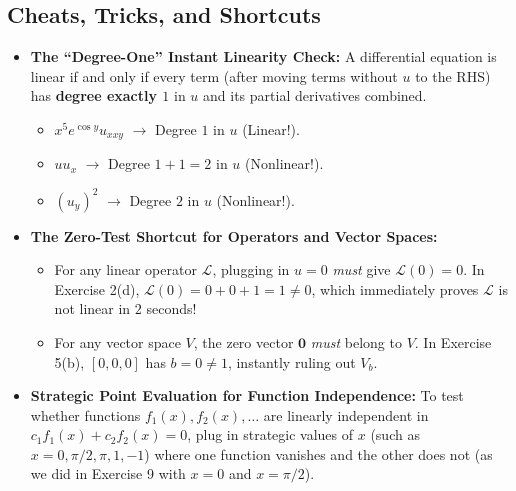 \documentclass[11pt,a4paper]{article}
\begin{document}
\subsection{Cheats, Tricks, and Shortcuts}
\begin{itemize}
    \item \textbf{The ``Degree-One'' Instant Linearity Check:} A differential equation is linear if and only if every term (after moving terms without $u$ to the RHS) has \textbf{degree exactly $1$} in $u$ and its partial derivatives combined.
    \begin{itemize}
        \item $x^5 e^{\cos y} u_{xxy}$ $\longrightarrow$ Degree $1$ in $u$ (Linear!).
        \item $u u_x$ $\longrightarrow$ Degree $1 + 1 = 2$ in $u$ (Nonlinear!).
        \item $(u_y)^2$ $\longrightarrow$ Degree $2$ in $u$ (Nonlinear!).
    \end{itemize}
    \item \textbf{The Zero-Test Shortcut for Operators and Vector Spaces:}
    \begin{itemize}
        \item For any linear operator $\mathcal{L}$, plugging in $u = 0$ \emph{must} give $\mathcal{L}(0) = 0$. In Exercise 2(d), $\mathcal{L}(0) = 0 + 0 + 1 = 1 \neq 0$, which immediately proves $\mathcal{L}$ is not linear in $2$ seconds!
        \item For any vector space $V$, the zero vector $\mathbf{0}$ \emph{must} belong to $V$. In Exercise 5(b), $[0, 0, 0]$ has $b = 0 \neq 1$, instantly ruling out $V_b$.
    \end{itemize}
    \item \textbf{Strategic Point Evaluation for Function Independence:} To test whether functions $f_1(x), f_2(x), \dots$ are linearly independent in $c_1 f_1(x) + c_2 f_2(x) = 0$, plug in strategic values of $x$ (such as $x = 0, \pi/2, \pi, 1, -1$) where one function vanishes and the other does not (as we did in Exercise 9 with $x=0$ and $x=\pi/2$).
\end{itemize}
\end{document}
